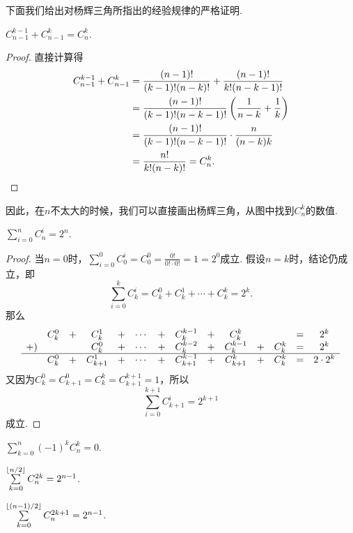 下面我们给出对杨辉三角所指出的经验规律的严格证明.
\begin{property}\label{theorem:组合数性质2}
\(C_{n-1}^{k-1} + C_{n-1}^k = C_n^k\).
\begin{proof}
直接计算得
\begin{align*}
	C_{n-1}^{k-1} + C_{n-1}^k
	&= \frac{(n-1)!}{(k-1)! (n-k)!} + \frac{(n-1)!}{k! (n-k-1)!} \\
	&= \frac{(n-1)!}{(k-1)! (n-k-1)!} \left( \frac{1}{n-k} + \frac{1}{k} \right) \\
	&= \frac{(n-1)!}{(k-1)! (n-k-1)!} \cdot \frac{n}{(n-k)k} \\
	&= \frac{n!}{k! (n-k)!}
	= C_n^k. \qedhere
\end{align*}
\end{proof}
\end{property}
因此，在\(n\)不太大的时候，我们可以直接画出杨辉三角，从图中找到\(C_n^k\)的数值.

\begin{property}\label{theorem:组合数性质3}
\(\sum\limits_{i=0}^n C_n^i = 2^n\).
\begin{proof}
当\(n=0\)时，\(\sum\limits_{i=0}^0 C_0^i = C_0^0 = \frac{0!}{0! \cdot 0!} = 1 = 2^0\)成立.
假设\(n=k\)时，结论仍成立，即\[
\sum\limits_{i=0}^k C_k^i
= C_k^0 + C_k^1 + \dotsb + C_k^k = 2^k.
\]那么\[
\begin{array}{*{14}{c}}
& C_k^0 &+& C_k^1 &+& \dotsb &+& C_k^{k-1} &+& C_k^k && &=& 2^k \\
+) & && C_k^0 &+& \dotsb &+& C_k^{k-2} &+& C_k^{k-1} &+& C_k^k &=& 2^k \\ \hline
& C_k^0 &+& C_{k+1}^1 &+& \dotsb &+& C_{k+1}^{k-1} &+& C_{k+1}^k &+& C_k^k &=& 2 \cdot 2^k
\end{array}
\]又因为\(C_k^0 = C_{k+1}^0 = C_k^k = C_{k+1}^{k+1} = 1\)，所以\[
\sum\limits_{i=0}^{k+1} C_{k+1}^i = 2^{k+1}
\]成立.
\end{proof}
\end{property}

\begin{property}\label{theorem:组合数性质4}
\(\sum\limits_{k=0}^n (-1)^k C_n^k = 0\).
\end{property}

\begin{property}\label{theorem:组合数性质5}
\(\sum\limits_{k=0}^{\lfloor n/2\rfloor} C_n^{2k} = 2^{n-1}\).
\end{property}
\begin{property}\label{theorem:组合数性质6}
\(\sum\limits_{k=0}^{\lfloor(n-1)/2\rfloor} C_n^{2k+1} = 2^{n-1}\).
\end{property}

